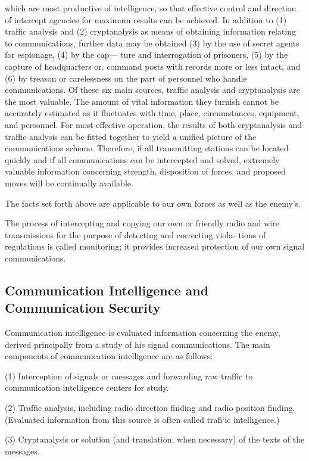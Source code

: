 which are most productive of intelligence, so that effective control and
direction of intercept agencies for maximum results can be achieved.
\mypara In addition to (1) trafﬁc analysis and (2) cryptanalysis as means of
obtaining information relating to communications, further data may be
obtained (3) by the use of secret agents for espionage, (4) by the cap—
ture and interrogation of prisoners, (5) by the capture of headquarters
or. command posts with records more or less intact, and (6) by treason
or carelessness on the part of personnel who handle communications. Of
these six main sources, trafﬁc analysis and cryptanalysis are the most
valuable. The amount of vital information they furnish cannot be
accurately estimated as it ﬂuctuates with time, place, circumstances,
equipment, and personnel. For most effective operation, the results of
both cryptanalysis and trafﬁc analysis can be ﬁtted together to yield a
uniﬁed picture of the communications scheme. Therefore, if all transmitting stations can be located quickly and if all communications can be
intercepted and solved, extremely valuable information concerning
strength, disposition of forces, and proposed moves will be continually
available.

\mypara The facts set forth above are applicable to our own forces as well
as the enemy’s.

\mypara The process of intercepting and copying our own or friendly radio
and wire transmissions for the purpose of detecting and correcting viola-
tions of regulations is called monitoring; it provides increased protection
of our own signal communications.

\subsection{Communication Intelligence and Communication Security}

\mypara Communication intelligence is evaluated information concerning the
enemy, derived principally from a study of his signal communications.
The main components of communication intelligence are as follows:

(1) Interception of signals or messages and forwarding raw trafﬁc
to communication intelligence centers for study.

(2) Trafﬁc analysis, including radio direction ﬁnding and radio
position ﬁnding. (Evaluated information from this source is
often called traﬁ‘ic intelligence.)

(3) Cryptanalysis or solution (and translation, when necessary) of
the texts of the messages.

